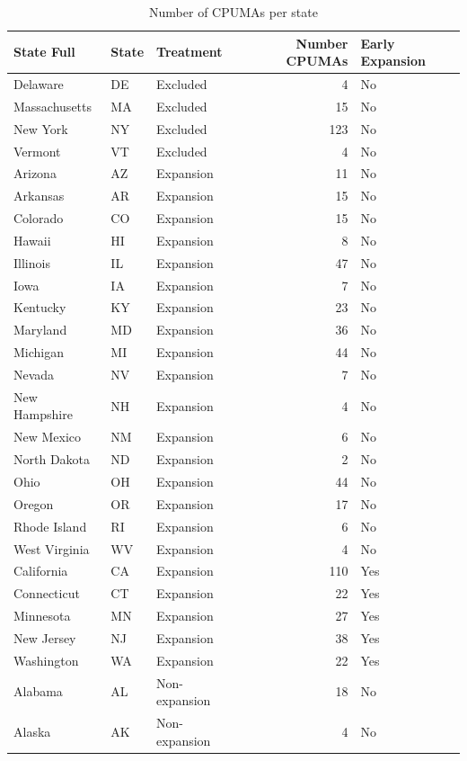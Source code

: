 \begin{table}[ht]
\centering
\caption{Number of CPUMAs per state}\label{tab:cpumasperstate}
\begin{tabular}{lllrl}
  \hline
State Full & State & Treatment & Number CPUMAs & Early Expansion \\ 
  \hline
Delaware & DE & Excluded &   4 & No \\ 
  Massachusetts & MA & Excluded &  15 & No \\ 
  New York & NY & Excluded & 123 & No \\ 
  Vermont & VT & Excluded &   4 & No \\ 
  Arizona & AZ & Expansion &  11 & No \\ 
  Arkansas & AR & Expansion &  15 & No \\ 
  Colorado & CO & Expansion &  15 & No \\ 
  Hawaii & HI & Expansion &   8 & No \\ 
  Illinois & IL & Expansion &  47 & No \\ 
  Iowa & IA & Expansion &   7 & No \\ 
  Kentucky & KY & Expansion &  23 & No \\ 
  Maryland & MD & Expansion &  36 & No \\ 
  Michigan & MI & Expansion &  44 & No \\ 
  Nevada & NV & Expansion &   7 & No \\ 
  New Hampshire & NH & Expansion &   4 & No \\ 
  New Mexico & NM & Expansion &   6 & No \\ 
  North Dakota & ND & Expansion &   2 & No \\ 
  Ohio & OH & Expansion &  44 & No \\ 
  Oregon & OR & Expansion &  17 & No \\ 
  Rhode Island & RI & Expansion &   6 & No \\ 
  West Virginia & WV & Expansion &   4 & No \\ 
  California & CA & Expansion & 110 & Yes \\ 
  Connecticut & CT & Expansion &  22 & Yes \\ 
  Minnesota & MN & Expansion &  27 & Yes \\ 
  New Jersey & NJ & Expansion &  38 & Yes \\ 
  Washington & WA & Expansion &  22 & Yes \\ 
  Alabama & AL & Non-expansion &  18 & No \\ 
  Alaska & AK & Non-expansion &   4 & No \\ 

\end{tabular}
\end{table}
